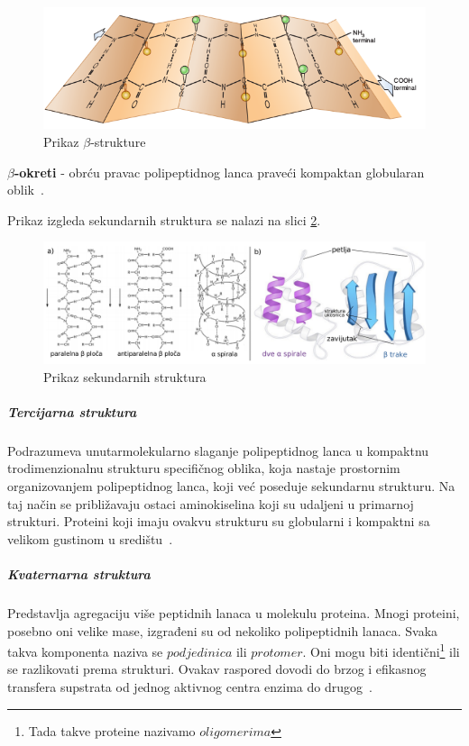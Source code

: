 \begin{figure}[h]
	\centering
    \includegraphics[width=1\textwidth]{Figures/BO/beta.png}
    \caption{Prikaz $\beta$-strukture~\cite{bmbg}}
    \label{fig:beta}
\end{figure}
\textbf{$\beta$-okreti} - obrću pravac polipeptidnog lanca praveći kompaktan globularan oblik~\cite{lippincott}. 
 
Prikaz izgleda sekundarnih struktura se nalazi na slici \ref{fig:ab}.
\begin{figure}[h]
	\centering
    \includegraphics[width=1\textwidth]{Figures/BO/sec_structure.png}
    \caption{Prikaz sekundarnih struktura~\cite{Vinterhalter}}
    \label{fig:ab}
\end{figure}
 

\subparagraph{Tercijarna struktura}
Podrazumeva unutarmolekularno slaganje polipeptidnog lanca u kompaktnu trodimenzionalnu strukturu specifičnog oblika, koja nastaje prostornim organizovanjem polipeptidnog lanca, koji već poseduje sekundarnu strukturu. Na taj način se približavaju ostaci aminokiselina koji su udaljeni u primarnoj strukturi. Proteini koji imaju ovakvu strukturu su globularni i kompaktni sa velikom gustinom u središtu~\cite{spasic,medbio}.
\subparagraph{Kvaternarna struktura}
Predstavlja agregaciju više peptidnih lanaca u molekulu proteina. Mnogi proteini, posebno oni velike mase, izgrađeni su od nekoliko polipeptidnih lanaca. Svaka takva komponenta naziva se $podjedinica$ ili $protomer$. Oni mogu biti identični\footnote{Tada takve proteine nazivamo $oligomerima$} ili se razlikovati prema strukturi. Ovakav raspored dovodi do brzog i efikasnog transfera supstrata od jednog aktivnog centra enzima do drugog~\cite{spasic,medbio}.
 
